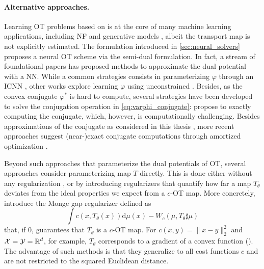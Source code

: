 \paragraph{Alternative approaches.}
Learning \acrlong{OT} problems based on  is at the core of many machine learning applications, including \acrlong{NF} \citep{rezende2015variational,huang2021convex} and generative models \citep{arjovsky2017wasserstein, genevay2018learning}, albeit the transport map is not explicitly estimated.
The formulation introduced in \cref{sec:neural_solvers} proposes a neural \acrlong{OT} scheme via the semi-dual formulation. In fact, a stream of foundational papers has proposed methods to approximate the dual potential with a \acrlong{NN}.
While a common strategies consists in parameterizing $\varphi$ through an \acrshort{ICNN} \citep{taghvaei20192, korotin2021wasserstein, makkuva2020optimal}, other works explore learning $\varphi$ using unconstrained  \citep{korotin2021neural, rout2021generative, nhan2019three}.
Besides, as the convex conjugate $\varphi^*$ is hard to compute, several strategies have been developed to solve the conjugation operation in \eqref{eq:varphi_conjugate}: \citet{taghvaei20192}  propose to exactly computing the conjugate, which, however, is computationally challenging. Besides approximations of the conjugate as considered in this thesis \citep{korotin2021wasserstein, makkuva2020optimal}, more recent approaches suggest (near-)exact conjugate computations through  amortized optimization \citep{amos2023amortizing}.

Beyond such approaches that parameterize the dual potentials of \acrlong{OT}, several approaches consider parameterizing map $T$ directly. This is done either without any regularization \citep{yang2018scalable}, or by introducing regularizers that quantify how far a map $T_\theta$ deviates from the ideal properties we expect from a $c$-OT map.
More concretely, \citet{uscidda2023monge} introduce the Monge gap regularizer defined as
\begin{equation*}
	\int c(x, T_\theta(x)) \textrm{d} \mu(x) - W_c(\mu, T_\theta \sharp \mu)
\end{equation*}
that, if $0$, guarantees that $T_\theta$ is a $c$-OT map. For $c(x,y) = \|x-y\|^2_2$ and ${\mathcal{X}} = {\mathcal{Y}} = \mathbb{R}^d$, for example, $T_\theta$ corresponds to a gradient of a convex function ().
The advantage of such methods is that they generalize to all cost functions $c$ and are not restricted to the squared Euclidean distance.


